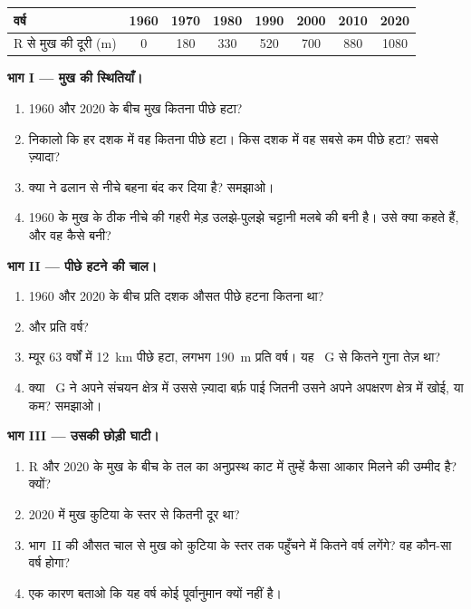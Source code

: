 \begin{problem}
\begin{center}
\smallskip
{\small
\begin{tabular}{|l|c|c|c|c|c|c|c|}
\hline
वर्ष & 1960 & 1970 & 1980 & 1990 & 2000 & 2010 & 2020 \\
\hline
R से मुख की दूरी (m) & 0 & 180 & 330 & 520 & 700 & 880 & 1080 \\
\hline
\end{tabular}}
\end{center}

\noindent\textbf{भाग I --- मुख की स्थितियाँ।}\par\nopagebreak
\begin{enumerate}[beginpenalty=10000]
  \item 1960 और 2020 के बीच मुख कितना पीछे हटा?
  \item निकालो कि हर दशक में वह कितना पीछे हटा। किस दशक में वह सबसे कम पीछे हटा? सबसे
        ज़्यादा?
  \item क्या  ने ढलान से नीचे बहना बंद कर दिया है? समझाओ।
  \item 1960 के मुख के ठीक नीचे की गहरी मेड़ उलझे-पुलझे चट्टानी मलबे की बनी है। उसे
        क्या कहते हैं, और वह कैसे बनी?
\end{enumerate}

\noindent\textbf{भाग II --- पीछे हटने की चाल।}\par\nopagebreak
\begin{enumerate}[resume, beginpenalty=10000]
  \item 1960 और 2020 के बीच प्रति दशक औसत पीछे हटना कितना था?
  \item और प्रति वर्ष?
  \item म्यूर  63 वर्षों में \qty{12}{km} पीछे हटा, लगभग \qty{190}{m} प्रति
        वर्ष। यह ~G से कितने गुना तेज़
        था?
  \item क्या ~G ने अपने संचयन क्षेत्र में उससे ज़्यादा बर्फ़ पाई जितनी उसने अपने
        अपक्षरण क्षेत्र में खोई, या कम? समझाओ।
\end{enumerate}

\noindent\textbf{भाग III --- उसकी छोड़ी घाटी।}\par\nopagebreak
\begin{enumerate}[resume, beginpenalty=10000]
  \item R और 2020 के मुख के बीच  के तल का अनुप्रस्थ काट में तुम्हें कैसा आकार
        मिलने की उम्मीद है? क्यों?
  \item 2020 में मुख कुटिया के स्तर से कितनी दूर था?
  \item भाग~II की औसत चाल से मुख को कुटिया के स्तर तक पहुँचने में कितने वर्ष लगेंगे?
        वह कौन-सा वर्ष होगा?
  \item एक कारण बताओ कि यह वर्ष कोई पूर्वानुमान क्यों नहीं है।
\end{enumerate}
\end{problem}
